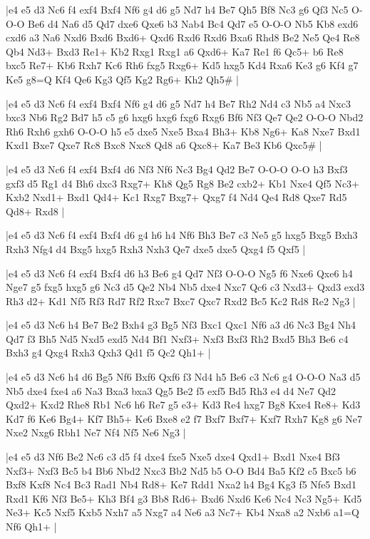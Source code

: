 \whitename{}
\blackname{}
\makegametitle
|e4 e5 d3 Nc6 f4 exf4 Bxf4 Nf6 g4 d6 g5 Nd7 h4 Be7 Qh5 Bf8 Nc3 g6 Qf3 Nc5 O-O-O Be6 d4 Na6 d5 Qd7 dxe6 Qxe6 b3 Nab4 Bc4 Qd7 e5 O-O-O Nb5 Kb8 exd6 cxd6 a3 Na6 Nxd6 Bxd6 Bxd6+ Qxd6 Rxd6 Rxd6 Bxa6 Rhd8 Be2 Ne5 Qe4 Re8 Qb4 Nd3+ Bxd3 Re1+ Kb2 Rxg1 Rxg1 a6 Qxd6+ Ka7 Re1 f6 Qc5+ b6 Re8 bxc5 Re7+ Kb6 Rxh7 Kc6 Rh6 fxg5 Rxg6+ Kd5 hxg5 Kd4 Rxa6 Ke3 g6 Kf4 g7 Ke5 g8=Q Kf4 Qe6 Kg3 Qf5 Kg2 Rg6+ Kh2 Qh5\#  |

\whitename{}
\blackname{}
\makegametitle
|e4 e5 d3 Nc6 f4 exf4 Bxf4 Nf6 g4 d6 g5 Nd7 h4 Be7 Rh2 Nd4 c3 Nb5 a4 Nxc3 bxc3 Nb6 Rg2 Bd7 h5 c5 g6 hxg6 hxg6 fxg6 Rxg6 Bf6 Nf3 Qe7 Qe2 O-O-O Nbd2 Rh6 Rxh6 gxh6 O-O-O h5 e5 dxe5 Nxe5 Bxa4 Bh3+ Kb8 Ng6+ Ka8 Nxe7 Bxd1 Kxd1 Bxe7 Qxe7 Rc8 Bxc8 Nxc8 Qd8 a6 Qxc8+ Ka7 Be3 Kb6 Qxc5\#  |

\whitename{}
\blackname{}
\makegametitle
|e4 e5 d3 Nc6 f4 exf4 Bxf4 d6 Nf3 Nf6 Nc3 Bg4 Qd2 Be7 O-O-O O-O h3 Bxf3 gxf3 d5 Rg1 d4 Bh6 dxc3 Rxg7+ Kh8 Qg5 Rg8 Be2 cxb2+ Kb1 Nxe4 Qf5 Nc3+ Kxb2 Nxd1+ Bxd1 Qd4+ Kc1 Rxg7 Bxg7+ Qxg7 f4 Nd4 Qe4 Rd8 Qxe7 Rd5 Qd8+ Rxd8  |

\whitename{}
\blackname{}
\makegametitle
|e4 e5 d3 Nc6 f4 exf4 Bxf4 d6 g4 h6 h4 Nf6 Bh3 Be7 c3 Ne5 g5 hxg5 Bxg5 Bxh3 Rxh3 Nfg4 d4 Bxg5 hxg5 Rxh3 Nxh3 Qe7 dxe5 dxe5 Qxg4 f5 Qxf5  |

\whitename{}
\blackname{}
\makegametitle
|e4 e5 d3 Nc6 f4 exf4 Bxf4 d6 h3 Be6 g4 Qd7 Nf3 O-O-O Ng5 f6 Nxe6 Qxe6 h4 Nge7 g5 fxg5 hxg5 g6 Nc3 d5 Qe2 Nb4 Nb5 dxe4 Nxc7 Qc6 c3 Nxd3+ Qxd3 exd3 Rh3 d2+ Kd1 Nf5 Rf3 Rd7 Rf2 Rxc7 Bxc7 Qxc7 Rxd2 Bc5 Kc2 Rd8 Re2 Ng3  |

\whitename{}
\blackname{}
\makegametitle
|e4 e5 d3 Nc6 h4 Be7 Be2 Bxh4 g3 Bg5 Nf3 Bxc1 Qxc1 Nf6 a3 d6 Nc3 Bg4 Nh4 Qd7 f3 Bh5 Nd5 Nxd5 exd5 Nd4 Bf1 Nxf3+ Nxf3 Bxf3 Rh2 Bxd5 Bh3 Be6 c4 Bxh3 g4 Qxg4 Rxh3 Qxh3 Qd1 f5 Qc2 Qh1+  |

\whitename{}
\blackname{}
\makegametitle
|e4 e5 d3 Nc6 h4 d6 Bg5 Nf6 Bxf6 Qxf6 f3 Nd4 h5 Be6 c3 Nc6 g4 O-O-O Na3 d5 Nb5 dxe4 fxe4 a6 Na3 Bxa3 bxa3 Qg5 Be2 f5 exf5 Bd5 Rh3 e4 d4 Ne7 Qd2 Qxd2+ Kxd2 Rhe8 Rb1 Nc6 h6 Re7 g5 e3+ Kd3 Re4 hxg7 Bg8 Kxe4 Re8+ Kd3 Kd7 f6 Ke6 Bg4+ Kf7 Bh5+ Ke6 Bxe8 e2 f7 Bxf7 Bxf7+ Kxf7 Rxh7 Kg8 g6 Ne7 Nxe2 Nxg6 Rbh1 Ne7 Nf4 Nf5 Ne6 Ng3  |

\whitename{}
\blackname{}
\makegametitle
|e4 e5 d3 Nf6 Be2 Nc6 c3 d5 f4 dxe4 fxe5 Nxe5 dxe4 Qxd1+ Bxd1 Nxe4 Bf3 Nxf3+ Nxf3 Bc5 b4 Bb6 Nbd2 Nxc3 Bb2 Nd5 b5 O-O Bd4 Ba5 Kf2 c5 Bxc5 b6 Bxf8 Kxf8 Nc4 Bc3 Rad1 Nb4 Rd8+ Ke7 Rdd1 Nxa2 h4 Bg4 Kg3 f5 Nfe5 Bxd1 Rxd1 Kf6 Nf3 Be5+ Kh3 Bf4 g3 Bb8 Rd6+ Bxd6 Nxd6 Ke6 Nc4 Nc3 Ng5+ Kd5 Ne3+ Kc5 Nxf5 Kxb5 Nxh7 a5 Nxg7 a4 Ne6 a3 Nc7+ Kb4 Nxa8 a2 Nxb6 a1=Q Nf6 Qh1+  |

